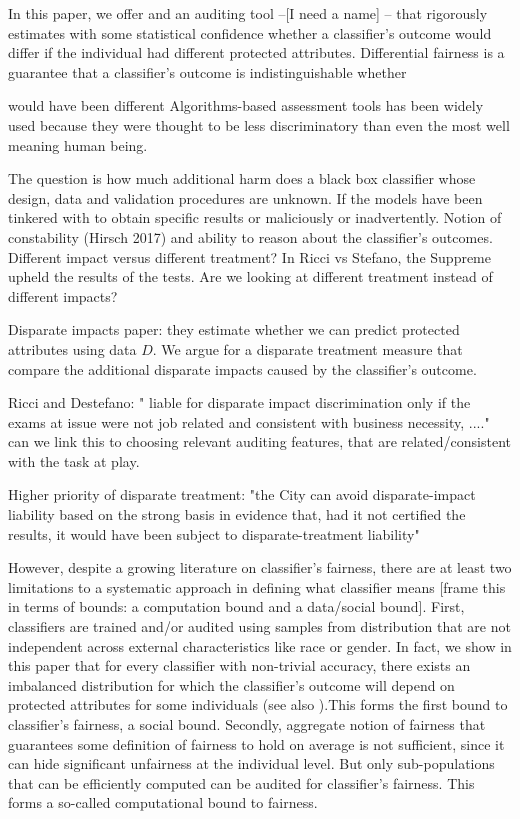 \documentclass{article}
\begin{document}
 
  
 
 
 \bigskip
 In this paper, we offer  and an auditing tool --[I need a name] -- that rigorously estimates with some statistical confidence whether a classifier's outcome would differ if the individual had different protected attributes. Differential fairness is a guarantee that a classifier's outcome is indistinguishable whether 
 
 
 would have been different Algorithms-based assessment tools has been widely used because they were thought to be less discriminatory than even the most well meaning human being.  

\bigskip
The question is how much additional harm does a black box classifier whose design, data and validation procedures are unknown. If the models have been tinkered with to obtain specific results or maliciously or inadvertently. Notion of constability (Hirsch 2017) and ability to reason about the classifier's outcomes. Different impact versus different treatment? In Ricci vs Stefano, the Suppreme upheld the results of the tests. Are we looking at different treatment instead of different impacts?

Disparate impacts paper: they estimate whether we can predict protected attributes using data $D$. We argue for a disparate treatment measure that compare the additional disparate impacts caused by the classifier's outcome. 

\bigskip
Ricci and Destefano: " liable for disparate impact discrimination only if the exams at issue were not job related and consistent with business necessity, ...." can we link this to choosing relevant auditing features, that are related/consistent with the task at play.

Higher priority of disparate treatment: "the City can avoid disparate-impact liability based on
the strong basis in evidence that, had it not certified the results, it
would have been subject to disparate-treatment liability"



\bigskip
However, despite a growing literature on classifier's fairness, there are at least two limitations to a systematic approach in defining what classifier means [frame this in terms of bounds: a computation bound and a data/social bound]. First, classifiers are trained and/or audited using samples from distribution that are not independent across external characteristics like race or gender. In fact, we show in this paper that for every classifier with non-trivial accuracy, there exists an imbalanced distribution for which the classifier's outcome will depend on protected attributes for some individuals (see also \cite{kleinberg2016inherent}).This forms the first bound to classifier's fairness, a social bound. Secondly, aggregate notion of fairness that guarantees some definition of fairness to hold on average is not sufficient, since it can hide significant unfairness at the individual level. But only sub-populations that can be efficiently computed can be audited for classifier's fairness. This forms a so-called computational bound to fairness.
\end{document}

